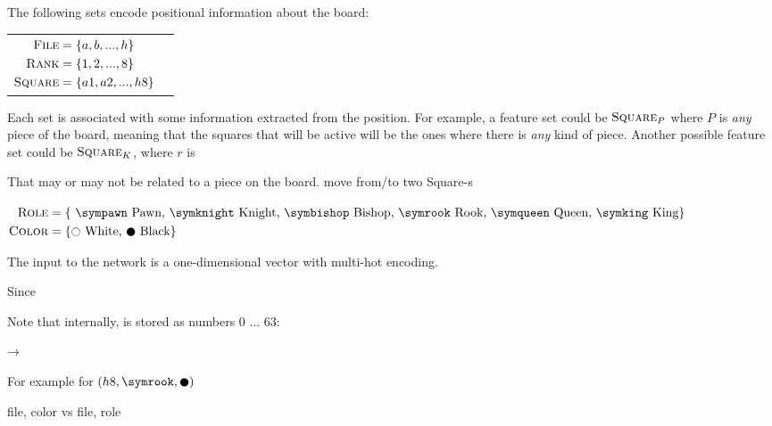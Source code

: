 The following sets encode positional information about the board:

\begin{center}
\begin{tabular}{cc}

$\begin{aligned}[t]
\textsc{File} &= \{a, b, ..., h\} \\
\textsc{Rank} &= \{1, 2, ..., 8\} \\
\textsc{Square} &= \{a1, a2, ..., h8\}
\end{aligned}$

&

\raisebox{-10ex}{
\chessboard[
    tinyboard,
    showmover=false,
    pgfstyle={text},
    text=\fontsize{1.2ex}{1.2ex}\bfseries\sffamily \currentwq,
    markboard
]
}

\end{tabular}
\end{center}

Each set is associated with some information extracted from the position. For example, a feature set could be $\textsc{Square}_{P}$ where $P$ is \textit{any} piece of the board, meaning that the squares that will be active will be the ones where there is \textit{any} kind of piece. Another possible feature set could be $\textsc{Square}_{K}$, where $r$ is 

That may or may not be related to a piece on the board.
move from/to
two Square-s

\begin{center}
$\begin{aligned}[t]
\fs{Role} &= \text{\{
    \sympawn\ Pawn,
    \symknight\ Knight,
    \symbishop\ Bishop,
    \symrook\ Rook,
    \symqueen\ Queen,
    \symking\ King\}} \\
\fs{Color} &= \text{\{\white\ White, \black\ Black\}}
\end{aligned}$
\end{center}

The input to the network is a one-dimensional vector with multi-hot encoding.


Since

Note that internally,  is stored as numbers 0 ... 63:

\pieceBoard → \pieceBoard


For example for $(h8, \symrook, \black)$

file, color vs file, role

